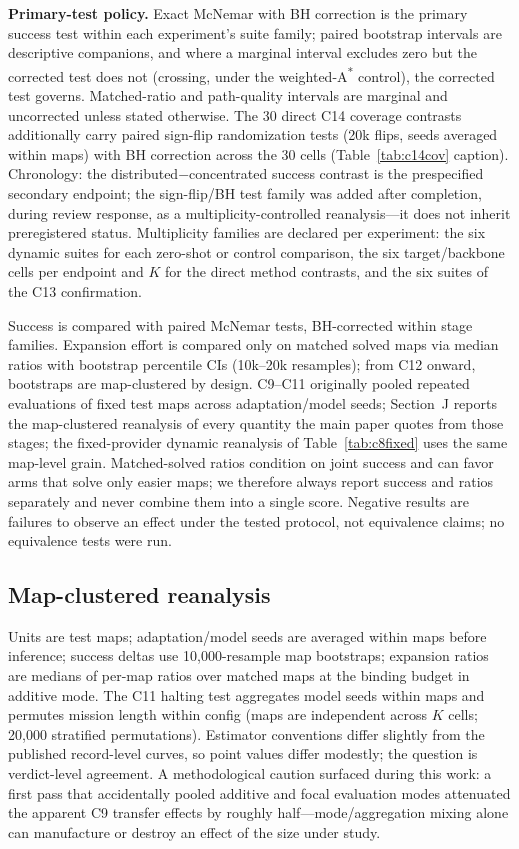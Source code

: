 \documentclass[letterpaper]{article} %
\newcommand{\stage}[1]{\textsc{#1}}
\begin{document}
\textbf{Primary-test policy.} Exact McNemar with BH correction is the primary success test within each experiment's suite family; paired bootstrap intervals are descriptive companions, and where a marginal interval excludes zero but the corrected test does not (crossing, under the weighted-A\textsuperscript{*} control), the corrected test governs. Matched-ratio and path-quality intervals are marginal and uncorrected unless stated otherwise. The 30 direct \stage{C14} coverage contrasts additionally carry paired sign-flip randomization tests (20k flips, seeds averaged within maps) with BH correction across the 30 cells (Table~\ref{tab:c14cov} caption). Chronology: the distributed$-$concentrated success contrast is the prespecified secondary endpoint; the sign-flip/BH test family was added after completion, during review response, as a multiplicity-controlled reanalysis---it does not inherit preregistered status. Multiplicity families are declared per experiment: the six dynamic suites for each zero-shot or control comparison, the six target/backbone cells per endpoint and $K$ for the direct method contrasts, and the six suites of the \stage{C13} confirmation.

Success is compared with paired McNemar tests, BH-corrected within stage families. Expansion effort is compared only on matched solved maps via median ratios with bootstrap percentile CIs (10k--20k resamples); from \stage{C12} onward, bootstraps are map-clustered by design. \stage{C9}--\stage{C11} originally pooled repeated evaluations of fixed test maps across adaptation/model seeds; Section~J reports the map-clustered reanalysis of every quantity the main paper quotes from those stages; the fixed-provider dynamic reanalysis of Table~\ref{tab:c8fixed} uses the same map-level grain. Matched-solved ratios condition on joint success and can favor arms that solve only easier maps; we therefore always report success and ratios separately and never combine them into a single score. Negative results are failures to observe an effect under the tested protocol, not equivalence claims; no equivalence tests were run.

\subsection{Map-clustered reanalysis}

Units are test maps; adaptation/model seeds are averaged within maps before inference; success deltas use 10{,}000-resample map bootstraps; expansion ratios are medians of per-map ratios over matched maps at the binding budget in additive mode. The \stage{C11} halting test aggregates model seeds within maps and permutes mission length within config (maps are independent across $K$ cells; 20{,}000 stratified permutations). Estimator conventions differ slightly from the published record-level curves, so point values differ modestly; the question is verdict-level agreement. A methodological caution surfaced during this work: a first pass that accidentally pooled additive and focal evaluation modes attenuated the apparent \stage{C9} transfer effects by roughly half---mode/aggregation mixing alone can manufacture or destroy an effect of the size under study.
\end{document}
